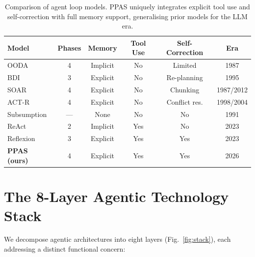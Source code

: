 \documentclass[review]{elsarticle}
\theoremstyle{definition}
\begin{document}
\begin{table}[ht]
\centering
\caption{Comparison of agent loop models. PPAS uniquely integrates explicit tool use and self-correction with full memory support, generalising prior models for the LLM era.}
\label{tab:loop-comparison}
\begin{tabular}{lccccc}
\toprule
\textbf{Model} & \textbf{Phases} & \textbf{Memory} & \textbf{Tool Use} & \textbf{Self-Correction} & \textbf{Era} \\
\midrule
OODA \citep{boyd1987ooda}           & 4 & Implicit  & No  & Limited     & 1987 \\
BDI \citep{rao1995bdi}              & 3 & Explicit  & No  & Re-planning & 1995 \\
SOAR \citep{laird2012soar}          & 4 & Explicit  & No  & Chunking    & 1987/2012 \\
ACT-R \citep{anderson2004act}       & 4 & Explicit  & No  & Conflict res. & 1998/2004 \\
Subsumption \citep{brooks1991intelligence} & --- & None & No & No         & 1991 \\
ReAct \citep{yao2023react}          & 2 & Implicit  & Yes & No          & 2023 \\
Reflexion \citep{shinn2023reflexion} & 3 & Explicit & Yes & Yes         & 2023 \\
\textbf{PPAS (ours)}                 & 4 & Explicit  & Yes & Yes         & 2026 \\
\bottomrule
\end{tabular}
\end{table}

\section{The 8-Layer Agentic Technology Stack}\label{sec:stack}

We decompose agentic architectures into eight layers (Fig.~\ref{fig:stack}), each addressing a distinct functional concern:
\end{document}

